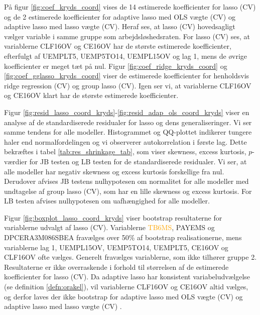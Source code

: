 På figur \ref{fig:coef_kryds_coord} vises de 14 estimerede koefficienter for lasso (CV) og de 2 estimerede koefficienter for adaptive lasso med OLS vægte (CV) og adaptive lasso med lasso vægte (CV).
Heraf ses, at lasso (CV) hovedsagligt vælger variable i samme gruppe som arbejdsløshedsraten.
For lasso (CV) ses, at variablerne \textcolor{blue3}{CLF16OV} og \textcolor{blue3}{CE16OV} har de største estimerede koefficienter, efterfulgt af \textcolor{blue3}{UEMPLT5}, \textcolor{blue3}{UEMP5TO14}, \textcolor{blue3}{UEMPL15OV} og \textcolor{blue3}{lag 1}, mens de øvrige koefficienter er meget tæt på nul. 
Figur \ref{fig:coef_ridge_kryds_coord} og \ref{fig:coef_gglasso_kryds_coord} viser de estimerede koefficienter for henholdsvis ridge regression (CV) og group lasso (CV).
Igen ser vi, at variablerne \textcolor{blue3}{CLF16OV} og \textcolor{blue3}{CE16OV} klart har de største estimerede koefficienter.    
%

Figur \ref{fig:resid_lasso_coord_kryds}-\ref{fig:resid_adap_ols_coord_kryds} viser en analyse af de standardiserede residualer for lasso og dens generaliseringer. 
Vi ser samme tendens for alle modeller. Histogrammet og QQ-plottet indikerer tungere haler end normalfordelingen og vi observerer autokorrelation i første lag.
Dette bekræftes i tabel \ref{tab:res_shrinkage_tab}, som viser skewness, excess kurtosis, $p$-værdier for JB testen og LB testen for de standardiserede residualer.
Vi ser, at alle modeller har negativ skewness og excess kurtosis forskellige fra nul. 
Derudover afvises JB testens nulhypotesen om normalitet for alle modeller med undtagelse af group lasso (CV), som har en lille skewness og excess kurtosis.
For LB testen afvises nulhypotesen om uafhængighed for alle modeller.

Figur \ref{fig:boxplot_lasso_coord_kryds} viser bootstrap resultaterne for variablerne udvalgt af lasso (CV).
Variablerne \textcolor{orange}{TB6MS}, \textcolor{blue3}{PAYEMS} og \textcolor{red3}{DPCERA3M086SBEA} fravælges over 50\% af bootstrap realisationerne, mens variablerne  \textcolor{blue3}{lag 1}, \textcolor{blue3}{UEMPL15OV}, \textcolor{blue3}{UEMP5TO14}, \textcolor{blue3}{UEMPLT5}, \textcolor{blue3}{CE16OV} og \textcolor{blue3}{CLF16OV} ofte vælges.
Generelt fravælges variablerne, som ikke tilhører gruppe 2.
Resultaterne er ikke overraskende i forhold til størrelsen af de estimerede koefficienter for lasso (CV).
Da adaptive lasso har konsistent variabeludvælgelse (se definition \ref{defn:orakel}), vil variablerne \textcolor{blue3}{CLF16OV} og \textcolor{blue3}{CE16OV} altid vælges, og derfor laves der ikke bootstrap for adaptive lasso med OLS vægte (CV) og adaptive lasso med lasso vægte (CV) .

